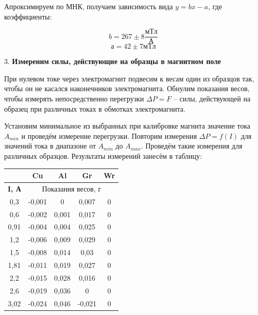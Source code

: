 \documentclass[11pt]{article}
\begin{document}
Апроксимируем по МНК, получаем зависимость вида $y = bx - a$, где коэффициенты:

\[b = 267 \pm 8 \frac{мТл}{А}\]
\[а = 42 \pm 7 мТл\]

\newpage

3. \textbf{Измереним силы, действующие на образцы в магнитном поле}

\medskip

При нулевом токе через электромагнит подвесим к весам один из образцов так, чтобы он не касался наконечников электромагнита. Обнулим показания весов, чтобы измерять непосредственно перегрузки $ \Delta P = F $ -- силы, действующей на образец при различных токах в обмотках электромагнита.

Установим минимальное из выбранных при калибровке магнита значение тока $ A_{min} $ и проведём измерение перегрузки. Повторим измерения $ \Delta P = f(I) $ для значений тока в диапазоне от $ A_{min} $ до $ A_{max} $. Проведём такие измерения для различных образцов. Результаты измерений занесём в таблицу:

\begin{table}[!ht]
\centering
\begin{tabular}{|c|cccc|}
\hline
\multicolumn{1}{|l|}{\textbf{}} & \multicolumn{1}{c|}{\cellcolor[HTML]{FFFFFF}Cu} & \multicolumn{1}{c|}{\cellcolor[HTML]{FFFFFF}Al} & \multicolumn{1}{c|}{\cellcolor[HTML]{FFFFFF}Gr} & \cellcolor[HTML]{FFFFFF}Wr \\ \hline
\textbf{I, А} & \multicolumn{4}{c|}{\cellcolor[HTML]{FFFFFF} Показания весов, г} \\ \hline
0,3 & \multicolumn{1}{c|}{-0,001} & \multicolumn{1}{c|}{0} & \multicolumn{1}{c|}{0,007} & 0 \\ \hline
0,6 & \multicolumn{1}{c|}{-0,002} & \multicolumn{1}{c|}{0,001} & \multicolumn{1}{c|}{0,017} & 0 \\ \hline
0,91 & \multicolumn{1}{c|}{-0,004} & \multicolumn{1}{c|}{0,004} & \multicolumn{1}{c|}{0,025} & 0 \\ \hline
1,2 & \multicolumn{1}{c|}{-0,006} & \multicolumn{1}{c|}{0,009} & \multicolumn{1}{c|}{0,029} & 0 \\ \hline
1,5 & \multicolumn{1}{c|}{-0,008} & \multicolumn{1}{c|}{0,014} & \multicolumn{1}{c|}{0,03} & 0 \\ \hline
1,81 & \multicolumn{1}{c|}{-0,011} & \multicolumn{1}{c|}{0,019} & \multicolumn{1}{c|}{0,027} & 0 \\ \hline
2,2 & \multicolumn{1}{c|}{-0,015} & \multicolumn{1}{c|}{0,028} & \multicolumn{1}{c|}{0,016} & 0 \\ \hline
2,6 & \multicolumn{1}{c|}{-0,019} & \multicolumn{1}{c|}{0,036} & \multicolumn{1}{c|}{0} & 0 \\ \hline
3,02 & \multicolumn{1}{c|}{-0,024} & \multicolumn{1}{c|}{0,046} & \multicolumn{1}{c|}{-0,021} & 0 \\ \hline
\end{tabular}
\end{table}
\end{document}
